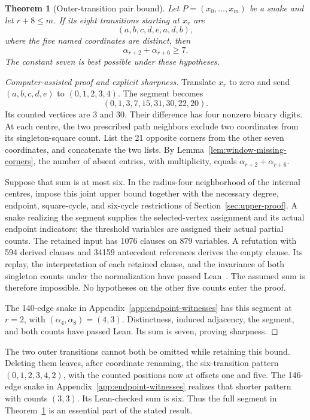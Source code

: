 \documentclass[11pt,a4paper]{article}
\newtheorem{theorem}{Theorem}[section]
\theoremstyle{definition}
\theoremstyle{remark}
\begin{document}
\begin{theorem}[Outer-transition pair bound]\label{thm:outer-pair}
Let $P=(x_0,\ldots,x_m)$ be a snake and let $r+8\le m$. If its eight transitions starting at $x_r$ are
\[
(a,b,c,d,e,a,d,b),
\]
where the five named coordinates are distinct, then
\[
\alpha_{r+2}+\alpha_{r+6}\ge7.
\]
The constant seven is best possible under these hypotheses.
\end{theorem}
\begin{proof}[Computer-assisted proof and explicit sharpness]
Translate $x_r$ to zero and send $(a,b,c,d,e)$ to $(0,1,2,3,4)$. The segment becomes
\[
(0,1,3,7,15,31,30,22,20).
\]
Its counted vertices are 3 and 30. Their difference has four nonzero binary digits. At each centre, the two prescribed path neighbors exclude two coordinates from its singleton-square count. List the 21 opposite corners from the other seven coordinates, and concatenate the two lists. By Lemma~\ref{lem:window-missing-corners}, the number of absent entries, with multiplicity, equals $\alpha_{r+2}+\alpha_{r+6}$.

Suppose that sum is at most six. In the radius-four neighborhood of the internal centres, impose this joint upper bound together with the necessary degree, endpoint, square-cycle, and six-cycle restrictions of Section~\ref{sec:upper-proof}. A snake realizing the segment supplies the selected-vertex assignment and its actual endpoint indicators; the threshold variables are assigned their actual partial counts. The retained input has 1076 clauses on 879 variables. A refutation with 594 derived clauses and 34159 antecedent references derives the empty clause. Its replay, the interpretation of each retained clause, and the invariance of both singleton counts under the normalization have passed Lean~\cite{outerpairarchive}. The assumed sum is therefore impossible. No hypotheses on the other five counts enter the proof.

The 140-edge snake in Appendix~\ref{app:endpoint-witnesses} has this segment at $r=2$, with $(\alpha_4,\alpha_8)=(4,3)$. Distinctness, induced adjacency, the segment, and both counts have passed Lean. Its sum is seven, proving sharpness.
\end{proof}

The two outer transitions cannot both be omitted while retaining this bound. Deleting them leaves, after coordinate renaming, the six-transition pattern $(0,1,2,3,4,2)$, with the counted positions now at offsets one and five. The 146-edge snake in Appendix~\ref{app:endpoint-witnesses} realizes that shorter pattern with counts $(3,3)$. Its Lean-checked sum is six. Thus the full segment in Theorem~\ref{thm:outer-pair} is an essential part of the stated result.
\end{document}
